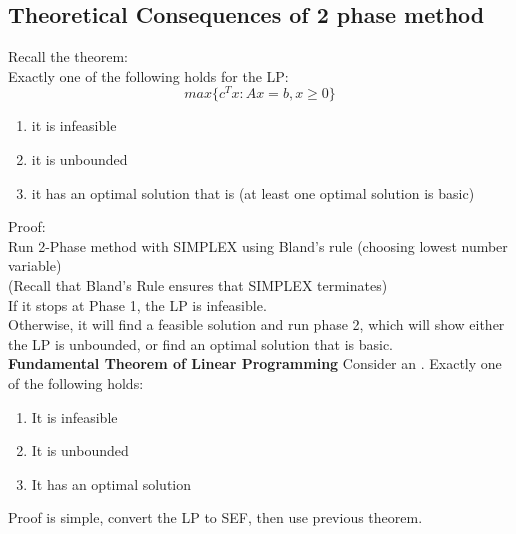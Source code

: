 \documentclass[letterpaper, 12pt]{article}
\newcommand{\red}[1]{{\color{red}{#1}}}
\begin{document}
    \subsection{Theoretical Consequences of 2 phase method}
    Recall the theorem:\\
    Exactly one of the following holds for the LP:
    $$max\{c^Tx:Ax = b, x\geq 0\}$$
    \begin{enumerate}
        \item it is infeasible
        \item it is unbounded
        \item it has an optimal solution that is \red{basic} (at least one optimal solution is basic)
    \end{enumerate}
    \bigskip
    Proof:\\
    Run 2-Phase method with SIMPLEX using Bland's rule (choosing lowest number variable)\\
    (Recall that Bland's Rule ensures that SIMPLEX terminates)\\
    If it stops at Phase 1, the LP is infeasible.\\
    Otherwise, it will find a feasible solution and run phase 2, which will show either the LP is unbounded, or find an optimal solution that is basic.\\
    \bigskip
    \textbf{Fundamental Theorem of Linear Programming}
    Consider an \red{arbitrary LP}. Exactly one of the following holds:
    \begin{enumerate}
        \item It is infeasible
        \item It is unbounded
        \item It has an optimal solution
    \end{enumerate}
    Proof is simple, convert the LP to SEF, then use previous theorem.
    \pagebreak
    
\end{document}
